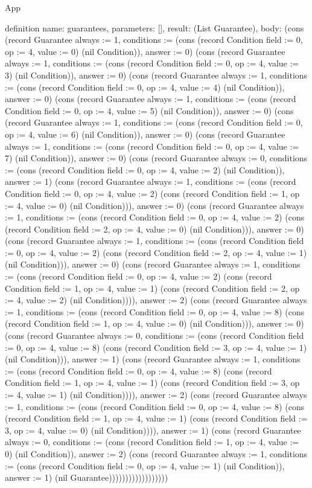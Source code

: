 \begin{lexlean}{App}
\begin{semanticmodule}
definition{
  name: guarantees,
  parameters: [],
  result: (List Guarantee),
  body: (cons (record Guarantee {always := 1, conditions := (cons (record Condition {field := 0, op := 4, value := 0}) (nil Condition)), answer := 0}) (cons (record Guarantee {always := 1, conditions := (cons (record Condition {field := 0, op := 4, value := 3}) (nil Condition)), answer := 0}) (cons (record Guarantee {always := 1, conditions := (cons (record Condition {field := 0, op := 4, value := 4}) (nil Condition)), answer := 0}) (cons (record Guarantee {always := 1, conditions := (cons (record Condition {field := 0, op := 4, value := 5}) (nil Condition)), answer := 0}) (cons (record Guarantee {always := 1, conditions := (cons (record Condition {field := 0, op := 4, value := 6}) (nil Condition)), answer := 0}) (cons (record Guarantee {always := 1, conditions := (cons (record Condition {field := 0, op := 4, value := 7}) (nil Condition)), answer := 0}) (cons (record Guarantee {always := 0, conditions := (cons (record Condition {field := 0, op := 4, value := 2}) (nil Condition)), answer := 1}) (cons (record Guarantee {always := 1, conditions := (cons (record Condition {field := 0, op := 4, value := 2}) (cons (record Condition {field := 1, op := 4, value := 0}) (nil Condition))), answer := 0}) (cons (record Guarantee {always := 1, conditions := (cons (record Condition {field := 0, op := 4, value := 2}) (cons (record Condition {field := 2, op := 4, value := 0}) (nil Condition))), answer := 0}) (cons (record Guarantee {always := 1, conditions := (cons (record Condition {field := 0, op := 4, value := 2}) (cons (record Condition {field := 2, op := 4, value := 1}) (nil Condition))), answer := 0}) (cons (record Guarantee {always := 1, conditions := (cons (record Condition {field := 0, op := 4, value := 2}) (cons (record Condition {field := 1, op := 4, value := 1}) (cons (record Condition {field := 2, op := 4, value := 2}) (nil Condition)))), answer := 2}) (cons (record Guarantee {always := 1, conditions := (cons (record Condition {field := 0, op := 4, value := 8}) (cons (record Condition {field := 1, op := 4, value := 0}) (nil Condition))), answer := 0}) (cons (record Guarantee {always := 0, conditions := (cons (record Condition {field := 0, op := 4, value := 8}) (cons (record Condition {field := 3, op := 4, value := 1}) (nil Condition))), answer := 1}) (cons (record Guarantee {always := 1, conditions := (cons (record Condition {field := 0, op := 4, value := 8}) (cons (record Condition {field := 1, op := 4, value := 1}) (cons (record Condition {field := 3, op := 4, value := 1}) (nil Condition)))), answer := 2}) (cons (record Guarantee {always := 1, conditions := (cons (record Condition {field := 0, op := 4, value := 8}) (cons (record Condition {field := 1, op := 4, value := 1}) (cons (record Condition {field := 3, op := 4, value := 0}) (nil Condition)))), answer := 1}) (cons (record Guarantee {always := 0, conditions := (cons (record Condition {field := 1, op := 4, value := 0}) (nil Condition)), answer := 2}) (cons (record Guarantee {always := 1, conditions := (cons (record Condition {field := 0, op := 4, value := 1}) (nil Condition)), answer := 1}) (nil Guarantee))))))))))))))))))
}


\end{semanticmodule}
\end{lexlean}
